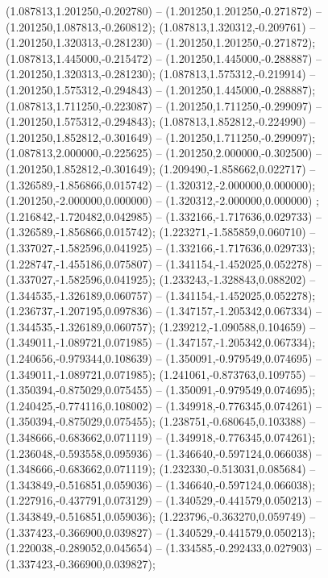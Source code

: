  (1.087813,1.201250,-0.202780) -- (1.201250,1.201250,-0.271872) -- (1.201250,1.087813,-0.260812);
 (1.087813,1.320312,-0.209761) -- (1.201250,1.320313,-0.281230) -- (1.201250,1.201250,-0.271872);
 (1.087813,1.445000,-0.215472) -- (1.201250,1.445000,-0.288887) -- (1.201250,1.320313,-0.281230);
 (1.087813,1.575312,-0.219914) -- (1.201250,1.575312,-0.294843) -- (1.201250,1.445000,-0.288887);
 (1.087813,1.711250,-0.223087) -- (1.201250,1.711250,-0.299097) -- (1.201250,1.575312,-0.294843);
 (1.087813,1.852812,-0.224990) -- (1.201250,1.852812,-0.301649) -- (1.201250,1.711250,-0.299097);
 (1.087813,2.000000,-0.225625) -- (1.201250,2.000000,-0.302500) -- (1.201250,1.852812,-0.301649);
 (1.209490,-1.858662,0.022717) -- (1.326589,-1.856866,0.015742) -- (1.320312,-2.000000,0.000000);
 (1.201250,-2.000000,0.000000) -- (1.320312,-2.000000,0.000000) ;
 (1.216842,-1.720482,0.042985) -- (1.332166,-1.717636,0.029733) -- (1.326589,-1.856866,0.015742);
 (1.223271,-1.585859,0.060710) -- (1.337027,-1.582596,0.041925) -- (1.332166,-1.717636,0.029733);
 (1.228747,-1.455186,0.075807) -- (1.341154,-1.452025,0.052278) -- (1.337027,-1.582596,0.041925);
 (1.233243,-1.328843,0.088202) -- (1.344535,-1.326189,0.060757) -- (1.341154,-1.452025,0.052278);
 (1.236737,-1.207195,0.097836) -- (1.347157,-1.205342,0.067334) -- (1.344535,-1.326189,0.060757);
 (1.239212,-1.090588,0.104659) -- (1.349011,-1.089721,0.071985) -- (1.347157,-1.205342,0.067334);
 (1.240656,-0.979344,0.108639) -- (1.350091,-0.979549,0.074695) -- (1.349011,-1.089721,0.071985);
 (1.241061,-0.873763,0.109755) -- (1.350394,-0.875029,0.075455) -- (1.350091,-0.979549,0.074695);
 (1.240425,-0.774116,0.108002) -- (1.349918,-0.776345,0.074261) -- (1.350394,-0.875029,0.075455);
 (1.238751,-0.680645,0.103388) -- (1.348666,-0.683662,0.071119) -- (1.349918,-0.776345,0.074261);
 (1.236048,-0.593558,0.095936) -- (1.346640,-0.597124,0.066038) -- (1.348666,-0.683662,0.071119);
 (1.232330,-0.513031,0.085684) -- (1.343849,-0.516851,0.059036) -- (1.346640,-0.597124,0.066038);
 (1.227916,-0.437791,0.073129) -- (1.340529,-0.441579,0.050213) -- (1.343849,-0.516851,0.059036);
 (1.223796,-0.363270,0.059749) -- (1.337423,-0.366900,0.039827) -- (1.340529,-0.441579,0.050213);
 (1.220038,-0.289052,0.045654) -- (1.334585,-0.292433,0.027903) -- (1.337423,-0.366900,0.039827);
